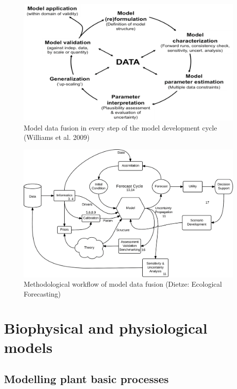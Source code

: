 \documentclass[12pt,oneside]{book}
\begin{document}
\begin{figure}

{\centering \includegraphics[width=0.8\linewidth]{figures/chap1/williams_fusion} 

}

\caption{Model data fusion in every step of the model development cycle (Williams et al. 2009)}\label{fig:f13}
\end{figure}

\begin{figure}

{\centering \includegraphics[width=0.8\linewidth]{figures/chap1/dietze_workflow} 

}

\caption{Methodological workflow of model data fusion (Dietze: Ecological Forecasting)}\label{fig:f14}
\end{figure}

\part{Biophysical and physiological
models}\label{part-biophysical-and-physiological-models}

\chapter{Modelling plant basic
processes}\label{modelling-plant-basic-processes}
\end{document}
